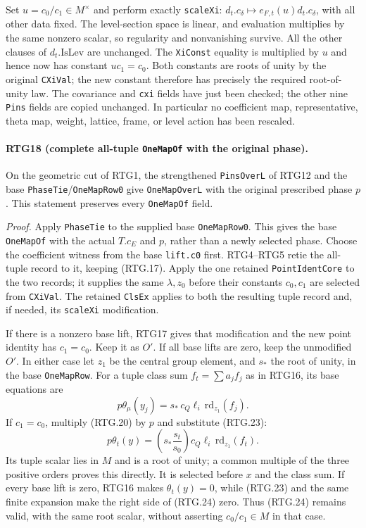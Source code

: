 Set $u=c_0/c_1\in M^\times$ and perform exactly \texttt{scaleXi}:
$d_t.c_\delta\mapsto e_{F,t}(u)d_t.c_\delta$, with all other data
fixed.  The level-section space is linear, and evaluation multiplies
by the same nonzero scalar, so regularity and nonvanishing survive.
All the other clauses of $d_t.\mathrm{IsLev}$ are unchanged.
The \texttt{XiConst} equality is multiplied by $u$ and hence now has
constant $uc_1=c_0$.  Both constants are roots of unity by the original
\texttt{CXiVal}; the new constant therefore has precisely the required
root-of-unity law.  The covariance and \texttt{cxi} fields have just
been checked; the other nine \texttt{Pins} fields are copied unchanged.
In particular no coefficient map, representative, theta
map, weight, lattice, frame, or level action has been rescaled.

\paragraph{RTG18 (complete all-tuple \texttt{OneMapOf} with the original phase).}
\label{claim:RTG18}
On the geometric cut of RTG1, the strengthened \texttt{PinsOverL}
of RTG12 and the base \texttt{PhaseTie}/\texttt{OneMapRow0} give
\texttt{OneMapOverL} with the original prescribed phase $p$.
This statement preserves every \texttt{OneMapOf} field.

\emph{Proof.}
Apply \texttt{PhaseTie} to the supplied base \texttt{OneMapRow0}.
This gives the base \texttt{OneMapOf} with the actual $T.c_E$ and
$p$, rather than a newly selected phase.  Choose the coefficient
witness from the base \texttt{lift.c0} first.  RTG4--RTG5 retie the
all-tuple record to it, keeping (RTG.17).  Apply the one retained
\texttt{PointIdentCore} to the two records; it supplies the same
$\lambda,z_0$ before their constants $c_0,c_1$ are selected from
\texttt{CXiVal}.  The retained \texttt{ClsEx} applies to both the
resulting tuple record and, if needed, its \texttt{scaleXi} modification.

If there is a nonzero base lift, RTG17 gives that modification and the
new point identity has $c_1=c_0$.  Keep it as $O'$.  If all base lifts
are zero, keep the unmodified $O'$.  In either case let $z_1$ be the
central group element, and $s_*$ the root of unity, in the base
\texttt{OneMapRow}.  For a tuple class sum $f_t=\sum a_j f_j$ as in
RTG16, its base equations are
\[
 p\theta_\mu(y_j)=
   s_*\,c_Q\ell_i\,\mathrm{rd}_{z_1}(f_j).
                                                               \tag{RTG.23}
\]
If $c_1=c_0$, multiply (RTG.20) by $p$ and substitute (RTG.23):
\[
 p\theta_t(y)=
   \left(s_*\frac{s_t}{s_0}\right)
       c_Q\ell_i\,\mathrm{rd}_{z_1}(f_t).                    \tag{RTG.24}
\]
Its tuple scalar lies in $M$ and is a root of unity; a common multiple
of the three positive orders proves this directly.  It is selected
before $x$ and the class sum.  If every base lift is zero, RTG16 makes
$\theta_t(y)=0$, while (RTG.23) and the same finite expansion make
the right side of (RTG.24) zero.  Thus (RTG.24) remains valid, with the
same root scalar, without asserting $c_0/c_1\in M$ in that case.

